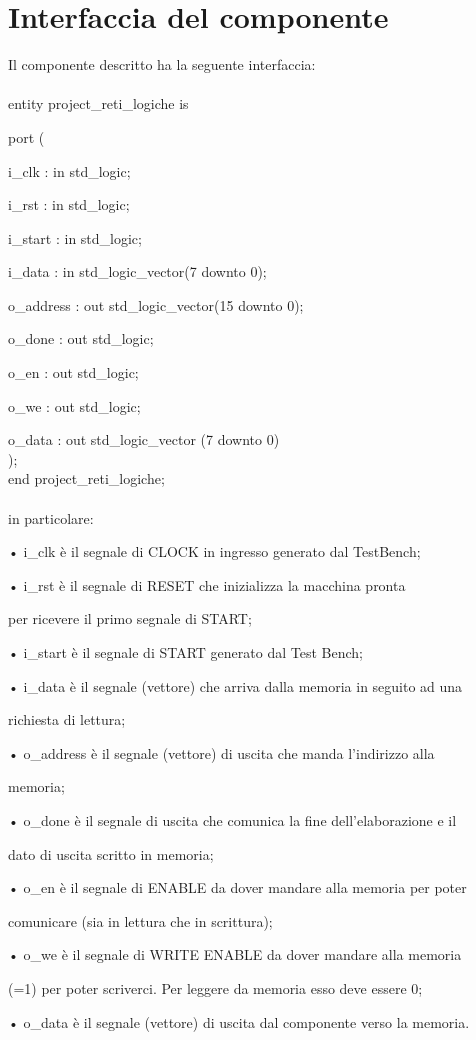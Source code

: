 \documentclass[a4paper, 12pt]{report}
\begin{document}
		\section{Interfaccia del componente}
			Il componente descritto ha la seguente interfaccia:\\\\
				entity project\_reti\_logiche is\par
				port (\par
					i\_clk : in std\_logic;\par
					i\_rst : in std\_logic;\par
					i\_start : in std\_logic;\par
					i\_data : in std\_logic\_vector(7 downto 0);\par
					o\_address : out std\_logic\_vector(15 downto 0);\par
					o\_done : out std\_logic;\par
					o\_en : out std\_logic;\par
					o\_we : out std\_logic;\par
					o\_data : out std\_logic\_vector (7 downto 0)\\
				);\\
				end project\_reti\_logiche;\\\\
			in particolare:\\\par
				• i\_clk è il segnale di CLOCK in ingresso generato dal TestBench;\par
				• i\_rst è il segnale di RESET che inizializza la macchina pronta\par\par per ricevere il primo segnale di START;\par
				• i\_start è il segnale di START generato dal Test Bench;\par
				• i\_data è il segnale (vettore) che arriva dalla memoria in seguito ad una\par\par richiesta di lettura;\par
				• o\_address è il segnale (vettore) di uscita che manda l’indirizzo alla\par\par memoria;\par
				• o\_done è il segnale di uscita che comunica la fine dell’elaborazione e il\par\par dato di uscita scritto in memoria;\par
				• o\_en è il segnale di ENABLE da dover mandare alla memoria per poter\par\par comunicare (sia in lettura che in scrittura);\par
				• o\_we è il segnale di WRITE ENABLE da dover mandare alla memoria\par\par (=1) per poter scriverci. Per leggere da memoria esso deve essere 0;\par
				• o\_data è il segnale (vettore) di uscita dal componente verso la memoria.\\
\end{document}

